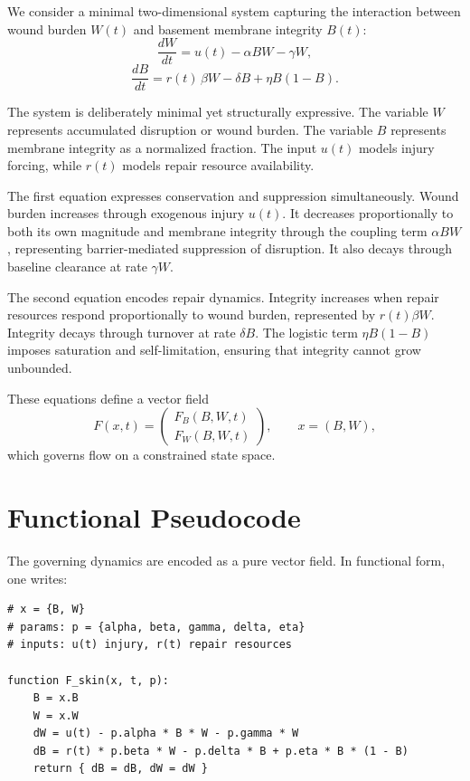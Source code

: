 \documentclass[12pt]{book}
\begin{document}
We consider a minimal two-dimensional system capturing the interaction
between wound burden $W(t)$ and basement membrane integrity $B(t)$:
\[
\frac{dW}{dt}
=
u(t)
-
\alpha B W
-
\gamma W,
\]
\[
\frac{dB}{dt}
=
r(t)\,\beta W
-
\delta B
+
\eta B(1-B).
\]

The system is deliberately minimal yet structurally expressive.
The variable $W$ represents accumulated disruption or wound burden.
The variable $B$ represents membrane integrity as a normalized fraction.
The input $u(t)$ models injury forcing, while $r(t)$ models repair resource
availability.

The first equation expresses conservation and suppression simultaneously.
Wound burden increases through exogenous injury $u(t)$.
It decreases proportionally to both its own magnitude and membrane integrity
through the coupling term $\alpha B W$, representing barrier-mediated
suppression of disruption.
It also decays through baseline clearance at rate $\gamma W$.

The second equation encodes repair dynamics.
Integrity increases when repair resources respond proportionally to wound
burden, represented by $r(t)\beta W$.
Integrity decays through turnover at rate $\delta B$.
The logistic term $\eta B(1-B)$ imposes saturation and self-limitation,
ensuring that integrity cannot grow unbounded.

These equations define a vector field
\[
F(x,t)
=
\begin{pmatrix}
F_B(B,W,t)\\[4pt]
F_W(B,W,t)
\end{pmatrix},
\qquad
x = (B,W),
\]
which governs flow on a constrained state space.

\section{Functional Pseudocode}

The governing dynamics are encoded as a pure vector field. In functional
form, one writes:

\begin{verbatim}
# x = {B, W}
# params: p = {alpha, beta, gamma, delta, eta}
# inputs: u(t) injury, r(t) repair resources

function F_skin(x, t, p):
    B = x.B
    W = x.W
    dW = u(t) - p.alpha * B * W - p.gamma * W
    dB = r(t) * p.beta * W - p.delta * B + p.eta * B * (1 - B)
    return { dB = dB, dW = dW }
\end{verbatim}
\end{document}
